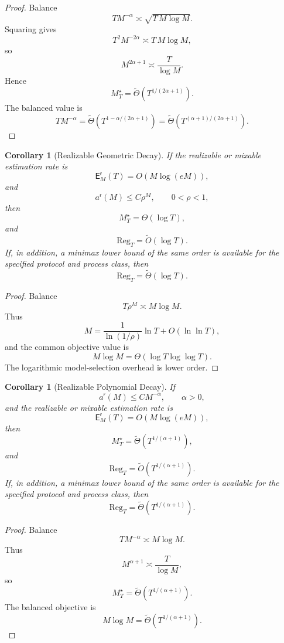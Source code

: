 \documentclass[12pt]{article}
\newtheorem{corollary}[theorem]{Corollary}
\theoremstyle{definition}
\newcommand{\Reg}{\mathrm{Reg}}
\newcommand{\Est}{\mathsf E}
\begin{document}
\begin{proof}
Balance
\[
T M^{-\alpha}
\asymp
\sqrt{T\,M\log M}.
\]
Squaring gives
\[
T^2M^{-2\alpha}
\asymp
T\,M\log M,
\]
so
\[
M^{2\alpha+1}
\asymp
\frac{T}{\log M}.
\]
Hence
\[
M_T^\star
=
\widetilde\Theta\!\left(T^{1/(2\alpha+1)}\right).
\]
The balanced value is
\[
T M^{-\alpha}
=
\widetilde\Theta\!\left(
T^{1-\alpha/(2\alpha+1)}
\right)
=
\widetilde\Theta\!\left(
T^{(\alpha+1)/(2\alpha+1)}
\right).
\]
\end{proof}

\begin{corollary}[Realizable Geometric Decay]
\label{cor:geo-realizable}
If the realizable or mixable estimation rate is
\[
\Est_M^{\mathsf r}(T)
=
O(M\log(eM)),
\]
and
\[
a^{\mathsf r}(M)\le C\rho^M,
\qquad
0<\rho<1,
\]
then
\[
M_T^\star
=
\Theta(\log T),
\]
and
\[
\Reg_T
=
\widetilde O(\log T).
\]
If, in addition, a minimax lower bound of the same order is available for the
specified protocol and process class, then
\[
\Reg_T
=
\widetilde\Theta(\log T).
\]
\end{corollary}

\begin{proof}
Balance
\[
T\rho^M
\asymp
M\log M.
\]
Thus
\[
M
=
\frac{1}{\ln(1/\rho)}
\ln T
+
O(\ln\ln T),
\]
and the common objective value is
\[
M\log M
=
\Theta(\log T\log\log T).
\]
The logarithmic model-selection overhead is lower order.
\end{proof}

\begin{corollary}[Realizable Polynomial Decay]
\label{cor:poly-realizable}
If
\[
a^{\mathsf r}(M)\le C M^{-\alpha},
\qquad
\alpha>0,
\]
and the realizable or mixable estimation rate is
\[
\Est_M^{\mathsf r}(T)
=
O(M\log(eM)),
\]
then
\[
M_T^\star
=
\widetilde\Theta\!\left(T^{1/(\alpha+1)}\right),
\]
and
\[
\Reg_T
=
\widetilde O\!\left(T^{1/(\alpha+1)}\right).
\]
If, in addition, a minimax lower bound of the same order is available for the
specified protocol and process class, then
\[
\Reg_T
=
\widetilde\Theta\!\left(T^{1/(\alpha+1)}\right).
\]
\end{corollary}

\begin{proof}
Balance
\[
T M^{-\alpha}
\asymp
M\log M.
\]
Thus
\[
M^{\alpha+1}
\asymp
\frac{T}{\log M},
\]
so
\[
M_T^\star
=
\widetilde\Theta\!\left(T^{1/(\alpha+1)}\right).
\]
The balanced objective is
\[
M\log M
=
\widetilde\Theta\!\left(T^{1/(\alpha+1)}\right).
\]
\end{proof}
\end{document}
